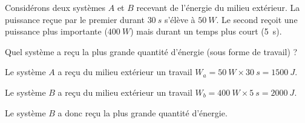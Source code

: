 \finEntrainement




\newpage





\hauteurLargeurCadreReponse		{6mm}{2cm}
\initialisationEntrainement


\debutEntrainement
Considérons deux systèmes $A$ et $B$ recevant de l'énergie du milieu extérieur. La puissance reçue par le premier durant $\SI{30}{s}$ s'élève à  $\SI{50}{W}$. Le second reçoit une puissance plus importante ($\SI{400}{W}$) mais durant un temps plus court (\SI{5}{s}).

\begin{enonce}
Quel système a reçu la plus grande quantité d'énergie (sous forme de travail) ?
\end{enonce}


\begin{corrige}
Le système $A$ a reçu du milieu extérieur un travail $W_a=\SI{50}{W} \times \SI{30}{s} =\SI{1500}{J}$.

Le système $B$  a reçu du milieu extérieur un travail $W_b=\SI{400}{W} \times \SI{5}{s} =\SI{2000}{J}$.

Le système $B$ a donc reçu la plus grande quantité d'énergie.
\end{corrige}

